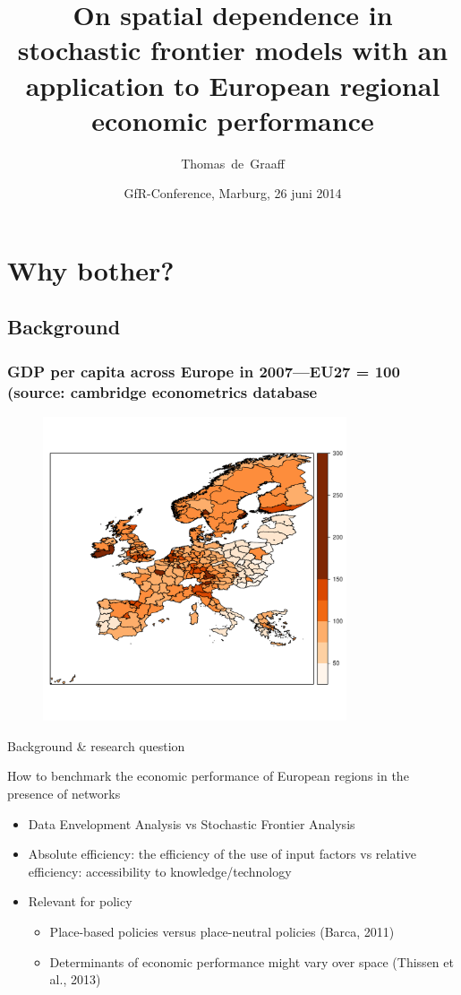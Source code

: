 \documentclass[ignorenonframetext]{beamer}
\title[Spatial Stochastic Frontiers]
{On spatial dependence in stochastic frontier models with an application to European regional economic performance}
\author[Thomas de Graaff] %
{Thomas~de~Graaff}
\date[GfR-Conference] %
{GfR-Conference, Marburg, 26 juni 2014}
\institute[] %
{
  Department of Spatial Economics,  Vrije Universiteit Amsterdam\\
  \url{https://github.com/thdegraaff}
}
\begin{document}
\begin{frame}
  \titlepage
\end{frame}

\section{Why bother?}

\subsection{Background}

\begin{frame}
\frametitle{GDP per capita across Europe in 2007---EU27 = 100 (source: cambridge econometrics database}
\begin{figure}[h]
	\center
	\includegraphics[width=0.8\textwidth]{gdppc}
\end{figure}
\end{frame}

\begin{frame}{Background \& research question}
\begin{block}{How to benchmark the economic performance of European regions in the presence of networks}
\begin{itemize}
	\item Data Envelopment Analysis vs Stochastic Frontier Analysis	
	\item Absolute efficiency: the efficiency of the use of input factors vs relative efficiency: accessibility to knowledge/technology
	\item Relevant for policy 
	\begin{itemize}
		\item Place-based policies versus place-neutral policies (Barca, 2011)
		\item Determinants of economic performance might vary over space (Thissen et al., 2013)
	\end{itemize}
\end{itemize}
\end{block}
\end{frame}
\end{document}
